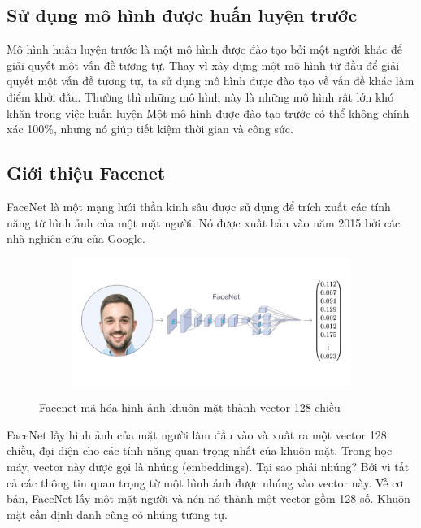 \subsection{Sử dụng mô hình được huấn luyện trước}

Mô hình huấn luyện trước là một mô hình được đào tạo bởi một người khác để giải quyết
một vấn đề tương tự. Thay vì xây dựng một mô hình từ đầu để giải quyết một vấn đề tương tự,
ta sử dụng mô hình được đào tạo về vấn đề khác làm điểm khởi đầu.
Thường thì những mô hình này là những mô hình rất lớn khó khăn trong việc huấn luyện
Một mô hình được đào tạo trước có thể không chính xác 100\%,
nhưng nó giúp tiết kiệm thời gian và công sức.

\subsection{Giới thiệu Facenet}

FaceNet là một mạng lưới thần kinh sâu được sử dụng để trích xuất các tính năng từ
hình ảnh của một mặt người. Nó được xuất bản vào năm 2015 bởi các nhà nghiên cứu của Google.

\begin{figure}
    \begin{subfigure}{1.\textwidth}
        \begin{center}
            \includegraphics[width=1.\linewidth]{Chapters/items/chap2_17.jpg}
        \end{center}
        \label{fig:chap2_17}
    \end{subfigure}
    \caption{Facenet mã hóa hình ảnh khuôn mặt thành vector 128 chiều}
\end{figure}

FaceNet lấy hình ảnh của mặt người làm đầu vào và xuất ra một vector 128 chiều,
đại diện cho các tính năng quan trọng nhất của khuôn mặt.
Trong học máy, vector này được gọi là nhúng (embeddings).
Tại sao phải nhúng? Bởi vì tất cả các thông tin quan trọng từ một hình ảnh được nhúng
vào vector này. Về cơ bản, FaceNet lấy một mặt người và nén nó thành một vector gồm 128 số.
Khuôn mặt cần định danh cũng có nhúng tương tự.

